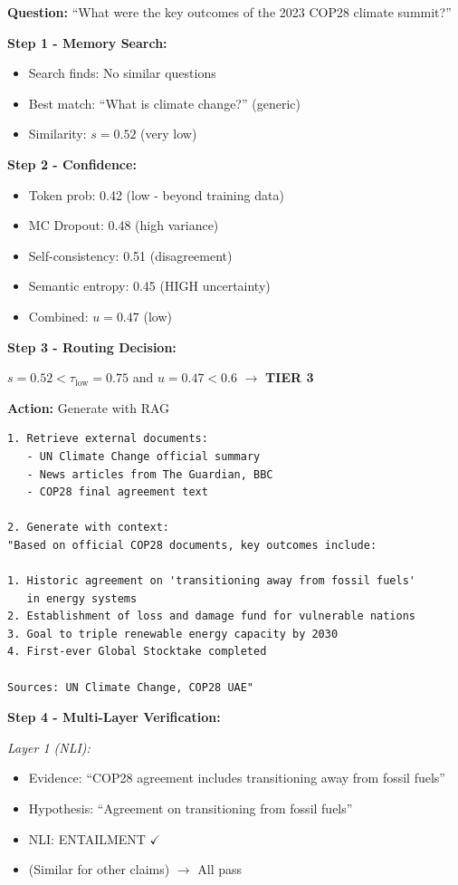 \documentclass[12pt,a4paper]{article}
\theoremstyle{definition}
\begin{document}
\begin{examplebox}[title=Tier 3: RAG + Comprehensive Verification]

\textbf{Question:} ``What were the key outcomes of the 2023 COP28 climate summit?''

\textbf{Step 1 - Memory Search:}
\begin{itemize}
    \item Search finds: No similar questions
    \item Best match: ``What is climate change?'' (generic)
    \item Similarity: $s = 0.52$ (very low)
\end{itemize}

\textbf{Step 2 - Confidence:}
\begin{itemize}
    \item Token prob: 0.42 (low - beyond training data)
    \item MC Dropout: 0.48 (high variance)
    \item Self-consistency: 0.51 (disagreement)
    \item Semantic entropy: 0.45 (HIGH uncertainty)
    \item Combined: $u = 0.47$ (low)
\end{itemize}

\textbf{Step 3 - Routing Decision:}

$s = 0.52 < \tau_{\text{low}} = 0.75$ and $u = 0.47 < 0.6$ $\rightarrow$ \textbf{TIER 3}

\textbf{Action:} Generate with RAG

\begin{verbatim}
1. Retrieve external documents:
   - UN Climate Change official summary
   - News articles from The Guardian, BBC
   - COP28 final agreement text

2. Generate with context:
"Based on official COP28 documents, key outcomes include:

1. Historic agreement on 'transitioning away from fossil fuels' 
   in energy systems
2. Establishment of loss and damage fund for vulnerable nations
3. Goal to triple renewable energy capacity by 2030
4. First-ever Global Stocktake completed

Sources: UN Climate Change, COP28 UAE"
\end{verbatim}

\textbf{Step 4 - Multi-Layer Verification:}

\textit{Layer 1 (NLI):}
\begin{itemize}
    \item Evidence: ``COP28 agreement includes transitioning away from fossil fuels''
    \item Hypothesis: ``Agreement on transitioning from fossil fuels''
    \item NLI: ENTAILMENT $\checkmark$
    \item (Similar for other claims) $\rightarrow$ All pass
\end{itemize}


\end{examplebox}
\end{document}
